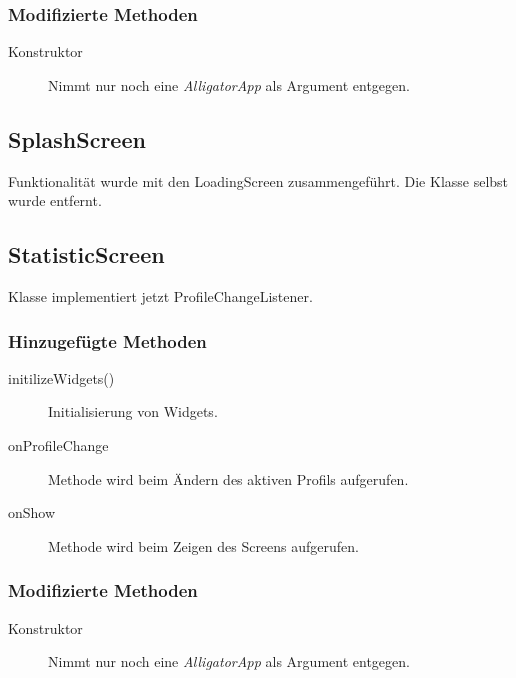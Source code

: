 \subsubsection{Modifizierte Methoden}
\begin{description}
\item[Konstruktor]
Nimmt nur noch eine \emph{AlligatorApp} als Argument entgegen.

\end{description}

\subsection{SplashScreen}
Funktionalität wurde mit den LoadingScreen zusammengeführt. Die Klasse selbst wurde entfernt.



\subsection{StatisticScreen}
Klasse implementiert jetzt ProfileChangeListener.
\subsubsection{Hinzugefügte Methoden}
\begin{description}
\item[initilizeWidgets()]
Initialisierung von Widgets.
\item[onProfileChange]
Methode wird beim Ändern des aktiven Profils aufgerufen.
\item[onShow]
Methode wird beim Zeigen des Screens aufgerufen.



\end{description}

\subsubsection{Modifizierte Methoden}
\begin{description}
\item[Konstruktor]
Nimmt nur noch eine \emph{AlligatorApp} als Argument entgegen.

\end{description}

